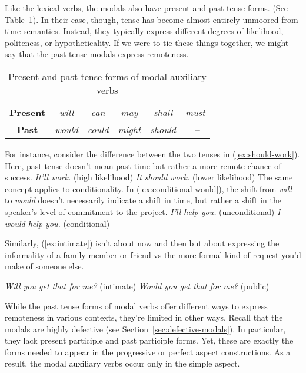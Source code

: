 Like the lexical verbs, the modals also have present and past-tense forms. (See Table~\ref{tab:modal-auxiliary-forms-tense}). In their case, though, tense has become almost entirely unmoored from time semantics. Instead, they typically express different degrees of likelihood, politeness, or hypotheticality. If we were to tie these things together, we might say that the past tense modals express remoteness.

\begin{table}[ht]
    \centering
    \begin{tabular}{cccccc}
        \textbf{Present} & \textit{will} & \textit{can} & \textit{may} & \textit{shall} & \textit{must} \\
        \textbf{Past} & \textit{would} & \textit{could} & \textit{might} & \textit{should} &~-- \\
    \end{tabular}
    \caption{Present and past-tense forms of modal auxiliary verbs}
    \label{tab:modal-auxiliary-forms-tense}
\end{table}
\noindent For instance, consider the difference between the two tenses in (\ref{ex:should-work}). Here, past tense doesn't mean past time but rather a more remote chance of success.
\ea\label{ex:should-work}
\ea \textit{It'll work.} \hfill(high likelihood)
\ex \textit{It should work.} \hfill(lower likelihood)
\z\z
The same concept applies to conditionality. In (\ref{ex:conditional-would}), the shift from \textit{will} to \textit{would} doesn't necessarily indicate a shift in time, but rather a shift in the speaker's level of commitment to the project.
\ea\label{ex:conditional-would}
\ea \textit{I'll help you.} \hfill(unconditional)
\ex \textit{I would help you.} \hfill(conditional)
\z\z

Similarly, (\ref{ex:intimate}) isn't about now and then but about expressing the informality of a family member or friend vs the more formal kind of request you'd make of someone else.

\ea \label{ex:intimate}
\ea \textit{Will you get that for me?} \hfill(intimate)
\ex \textit{Would you get that for me?} \hfill(public)
\z
\z{}

While the past tense forms of modal verbs offer different ways to express remoteness in various contexts, they're limited in other ways. Recall that the modals are highly defective (see Section~\ref{sec:defective-modals}). In particular, they lack present participle and past participle forms. Yet, these are exactly the forms needed to appear in the progressive or perfect aspect constructions. As a result, the modal auxiliary verbs occur only in the simple aspect.

